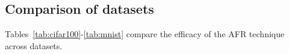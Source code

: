 \newpage
\subsection{Comparison of datasets}
Tables~\ref{tab:cifar100}-\ref{tab:mnist} compare the efficacy of the AFR technique across datasets.





